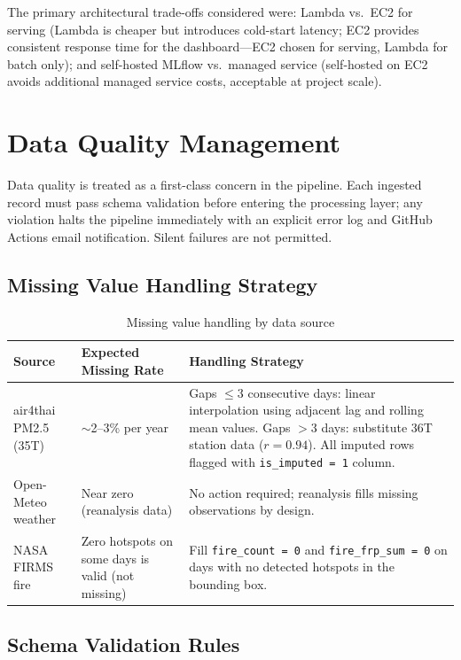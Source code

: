 \documentclass[12pt,a4paper]{report}
\begin{document}
The primary architectural trade-offs considered were: Lambda vs.\ EC2 for serving (Lambda is cheaper but introduces cold-start latency; EC2 provides consistent response time for the dashboard---EC2 chosen for serving, Lambda for batch only); and self-hosted MLflow vs.\ managed service (self-hosted on EC2 avoids additional managed service costs, acceptable at project scale).

\section{Data Quality Management}

Data quality is treated as a first-class concern in the pipeline. Each ingested record must pass schema validation before entering the processing layer; any violation halts the pipeline immediately with an explicit error log and GitHub Actions email notification. Silent failures are not permitted.

\subsection{Missing Value Handling Strategy}

\begin{table}[H]
\centering
\caption{Missing value handling by data source}
\label{tab:missing_values}
\begin{tabularx}{\textwidth}{@{}p{3cm}p{3.5cm}X@{}}
\toprule
\textbf{Source} & \textbf{Expected Missing Rate} & \textbf{Handling Strategy} \\
\midrule
air4thai PM2.5 (35T) &
  $\sim$2--3\% per year &
  Gaps $\leq$3 consecutive days: linear interpolation using adjacent lag and rolling mean values. Gaps $>$3 days: substitute 36T station data ($r = 0.94$). All imputed rows flagged with \texttt{is\_imputed = 1} column. \\[6pt]
Open-Meteo weather &
  Near zero (reanalysis data) &
  No action required; reanalysis fills missing observations by design. \\[6pt]
NASA FIRMS fire &
  Zero hotspots on some days is valid (not missing) &
  Fill \texttt{fire\_count = 0} and \texttt{fire\_frp\_sum = 0} on days with no detected hotspots in the bounding box. \\
\bottomrule
\end{tabularx}
\end{table}

\subsection{Schema Validation Rules}
\end{document}
